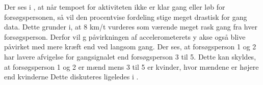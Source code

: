 Der ses i , at når tempoet for aktiviteten ikke er klar gang eller løb for forsøgspersonen, så vil den procentvise fordeling stige meget drastisk for gang data. Dette grunder i, at 8 km/t vurderes som værende meget rask gang fra hver forsøgsperson. Derfor vil g påvirkningen af accelerometerets y akse også blive påvirket med mere kræft end ved langsom gang. Der ses, at forsøgsperson 1 og 2 har lavere afvigelse for gangsignalet end forsøgsperson 3 til 5. Dette kan skyldes, at forsøgsperson 1 og 2 er mænd mens 3 til 5 er kvinder, hvor mændene er højere end kvinderne  Dette diskuteres ligeledes i .


